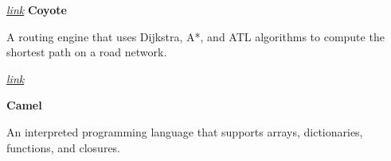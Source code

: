 \begin{twocolentry}{
		\textit{\href{https://github.com/mehrdad3301/coyote}{link}}}
	\textbf{Coyote}
\end{twocolentry}

\begin{onecolentry}
	A routing engine that uses Dijkstra, A*, and ATL algorithms to compute the shortest path on a road network.  
\end{onecolentry}

\vspace{0.2 cm}

\begin{twocolentry}{
		
		
		\textit{\href{https://github.com/camel-lang/interpreter}{link}}}
	\textbf{Camel}
\end{twocolentry}

\begin{onecolentry}
	An interpreted programming language that supports arrays, dictionaries, functions, and closures.  
\end{onecolentry}

